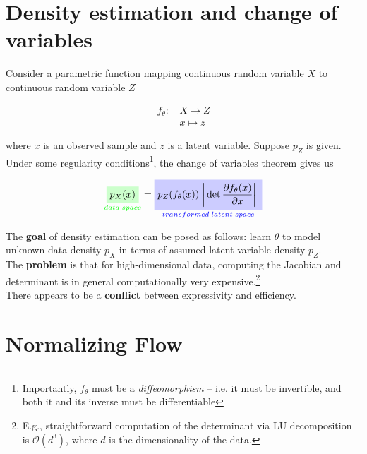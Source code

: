 \documentclass[10pt]{beamer}
\begin{document}
\section{Density estimation and change of variables} 

\begin{frame}
Consider a parametric function mapping continuous random variable $X$ to continuous random variable $Z$

\begin{align*}
f_\theta:  &\, X \to Z \\
			&\, x \mapsto z 
\end{align*}

where $x$ is an observed sample and $z$ is a latent variable.  Suppose $p_Z$ is given.   
\vfill
Under some regularity conditions\footnote{Importantly, $f_\theta$ must be a \textit{diffeomorphism} -- i.e. it must be invertible, and both it and its inverse must be differentiable}, the change of variables theorem gives us

\[ \labeledgreenbox{data \; space}{$p_X(x)$} = \labeledbluebox{transformed \; latent \; space}{$p_Z( f_\theta(x) ) \absdet{\df{\partial f_\theta(x)}{\partial x}}$}  \]  
\end{frame}

\begin{frame}
The \textbf{goal} of density estimation can be posed as follows: learn $\theta$ to model unknown data density $p_X$ in terms of assumed latent variable density $p_Z$.   \\
\pause 
\vfill \vfill \vfill 
The \textbf{problem} is that for high-dimensional data, computing the Jacobian and determinant is in general computationally very expensive.\footnote{E.g., straightforward computation of the determinant via LU decomposition is $\mathcal{O}(d^3)$, where $d$ is the dimensionality of the data.} \\
\pause 
\vfill \vfill \vfill 
There appears to be a \textbf{conflict} between expressivity and efficiency.
\end{frame}



\section{Normalizing Flow} 
\end{document}

